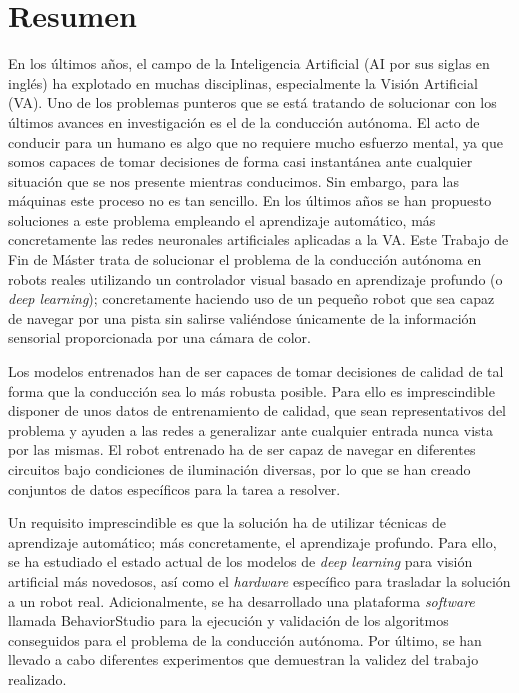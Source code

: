 

\thispagestyle{plain}			%
\setlength{\parskip}{0pt plus 1.0pt}
\section*{Resumen}
En los últimos años, el campo de la Inteligencia Artificial (AI por sus siglas en inglés) ha explotado en muchas disciplinas, especialmente la Visión Artificial (VA). Uno de los problemas punteros que se está tratando de solucionar con los últimos avances en investigación es el de la conducción autónoma. El acto de conducir para un humano es algo que no requiere mucho esfuerzo mental, ya que somos capaces de tomar decisiones de forma casi instantánea ante cualquier situación que se nos presente mientras conducimos. Sin embargo, para las máquinas este proceso no es tan sencillo. En los últimos años se han propuesto soluciones a este problema empleando el aprendizaje automático, más concretamente las redes neuronales artificiales aplicadas a la VA. Este Trabajo de Fin de Máster trata de solucionar el problema de la conducción autónoma en robots reales utilizando un controlador visual basado en aprendizaje profundo (o \textit{deep learning}); concretamente haciendo uso de un pequeño robot que sea capaz de navegar por una pista sin salirse valiéndose únicamente de la información sensorial proporcionada por una cámara de color.\newline

Los modelos entrenados han de ser capaces de tomar decisiones de calidad de tal forma que la conducción sea lo más robusta posible. Para ello es imprescindible disponer de unos datos de entrenamiento de calidad, que sean representativos del problema y ayuden a las redes a generalizar ante cualquier entrada nunca vista por las mismas. El robot entrenado ha de ser capaz de navegar en diferentes circuitos bajo condiciones de iluminación diversas, por lo que se han creado conjuntos de datos específicos para la tarea a resolver.\newline

Un requisito imprescindible es que la solución ha de utilizar técnicas de aprendizaje automático; más concretamente, el aprendizaje profundo. Para ello, se ha estudiado el estado actual de los modelos de \textit{deep learning} para visión artificial más novedosos, así como el \textit{hardware} específico para trasladar la solución a un robot real. Adicionalmente, se ha desarrollado una plataforma \textit{software} llamada BehaviorStudio para la ejecución y validación de los algoritmos conseguidos para el problema de la conducción autónoma. Por último, se han llevado a cabo diferentes experimentos que demuestran la validez del trabajo realizado.\newline

